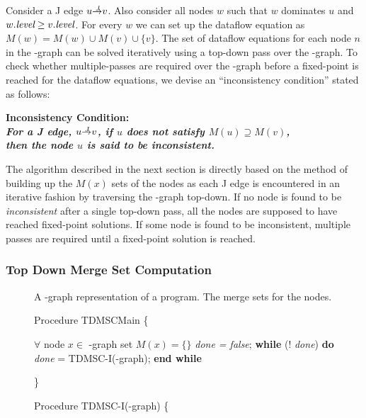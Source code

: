 {Consider a J edge $u \st{J} v$. Also consider all nodes $w$ such that $w$ 
dominates $u$ and $w.\textit{level} \geq v.\textit{level}$. For every $w$ we can set up the 
dataflow equation as $M(w) = M(w) \cup M(v) \cup \{v\}$. The set of dataflow 
equations for each node $n$ in the \DJ-graph can be solved iteratively using a 
top-down pass over the \DJ-graph. To check whether multiple-passes are required 
over the \DJ-graph before a fixed-point is reached for the dataflow equations, 
we devise an ``inconsistency condition'' stated as follows:

\begin{center}
\bf{Inconsistency Condition:}\\
\it{For a J edge, $u \st{J} v$, if $u$ does not satisfy
$M(u)\supseteq M(v)$,\\ then the node $u$ is said to be inconsistent}. 
\end{center}

The algorithm described in the next section is directly based on the method of building
up the $M(x)$ sets of the nodes as each J edge is encountered in an iterative fashion by
traversing the \DJ-graph top-down. If no node is found to be \emph{inconsistent} after a single 
top-down pass, all the nodes are supposed to have reached fixed-point solutions. If some node
is found to be inconsistent, multiple passes are required until a fixed-point solution is reached.


\subsubsection{Top Down Merge Set Computation}

\begin{figure}[!ht]
\centering
\begin{minipage}[t]{5in}
 A \DJ-graph representation of a program.
 The merge sets for the nodes.

\setcounter{linectr}{0}
Procedure TDMSCMain
\{
\begin{code}
 $\forall$ node $x \in$ \DJ-graph set $M(x) = \{\}$
 {\it done = false};
 {\bf while} (! {\it done}) {\bf do}
     {\it done} = TDMSC-I(\DJ-graph);
 {\bf end while}
\end{code}
\}

Procedure TDMSC-I(\DJ-graph)
\{
\begin{code}


\end{code}
\end{minipage}
\end{figure}}
